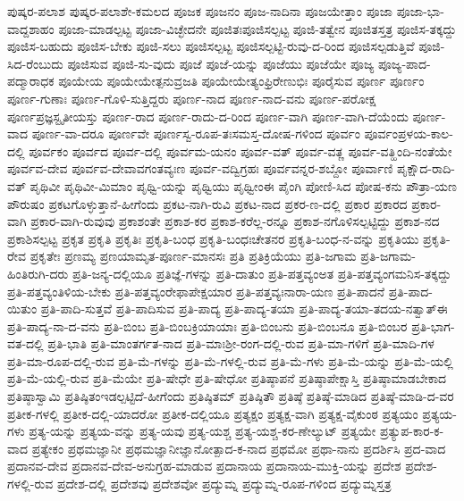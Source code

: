 {ಪುಷ್ಕರ-ಪಲಾಶ
ಪುಷ್ಕರ-ಪಲಾಶೇ-ಕಮಲದ
ಪೂಜಕ
ಪೂಜನಂ
ಪೂಜ-ನಾದಿನಾ
ಪೂಜಯೇತ್ತಾಂ
ಪೂಜಾ
ಪೂಜಾ-ಭಾ-ವಾದ್ದಶಾಹಂ
ಪೂಜಾ-ಮಾಡಲ್ಪಟ್ಟ
ಪೂಜಾ-ವಿಚ್ಛೇದನೇ
ಪೂಜಿತಃಪೂಜಿಸಲ್ಪಟ್ಟ
ಪೂಜಿ-ತತ್ವೇನ
ಪೂಜಿತಸ್ತತ್ರ
ಪೂಜಿಸ-ತಕ್ಕದ್ದು
ಪೂಜಿಸ-ಬಹುದು
ಪೂಜಿಸ-ಬೇಕು
ಪೂಜಿ-ಸಲು
ಪೂಜಿಸಲ್ಪಟ್ಟ
ಪೂಜಿಸಲ್ಪಟ್ಟಿ-ರುವು-ದ-ರಿಂದ
ಪೂಜಿಸಲ್ಪಡುತ್ತಿವೆ
ಪೂಜಿ-ಸಿದ-ರೆಂಬುದು
ಪೂಜಿಸುವ
ಪೂಜಿ-ಸು-ವುದು
ಪೂಜೆ
ಪೂಜೆ-ಯನ್ನು
ಪೂಜೆಯು
ಪೂಜೆಯೇ
ಪೂಜ್ಯ
ಪೂಜ್ಯ-ಪಾದ-ಪದ್ಮಾರಾಧಕ
ಪೂಯೇಯ
ಪೂಯೇಯೇತ್ಪನುವ್ರಜತಿ
ಪೂಯೇಯೇತ್ಯಂಫ್ರಿರೇಣುಭಿಃ
ಪೂರೈಸುವ
ಪೂರ್ಣ
ಪೂರ್ಣಂ
ಪೂರ್ಣ-ಗುಣಾಃ
ಪೂರ್ಣ-ಗೊಳಿ-ಸುತ್ತಿದ್ದರು
ಪೂರ್ಣ-ನಾದ
ಪೂರ್ಣ-ನಾದ-ವನು
ಪೂರ್ಣ-ಪರೋಕ್ಷ
ಪೂರ್ಣಪ್ರಜ್ಞಸ್ಟೃತೀಯಸ್ತು
ಪೂರ್ಣ-ರಾದ
ಪೂರ್ಣ-ರಾದು-ದ-ರಿಂದ
ಪೂರ್ಣ-ವಾಗಿ
ಪೂರ್ಣ-ವಾಗಿ-ದೆಯೆಂದು
ಪೂರ್ಣ-ವಾದ
ಪೂರ್ಣ-ವಾ-ದರೂ
ಪೂರ್ಣವೇ
ಪೂರ್ಣಸ್ವ-ರೂಪ-ತಃಸಮಸ್ತ-ದೋಷ-ಗಳಿಂದ
ಪೂರ್ವಂ
ಪೂರ್ವಂಪ್ರಳಯ-ಕಾಲ-ದಲ್ಲಿ
ಪೂರ್ವಕಂ
ಪೂರ್ವದ
ಪೂರ್ವ-ದಲ್ಲಿ
ಪೂರ್ವಮ-ಯನಂ
ಪೂರ್ವ-ವತ್
ಪೂರ್ವ-ವತ್ಣ
ಪೂರ್ವ-ವತ್ಹಿಂದಿ-ನಂತೆಯೇ
ಪೂರ್ವವ-ದೇವ
ಪೂರ್ವವ-ದೇವಾವಗಂತವ್ಯಃಣ
ಪೂರ್ವ-ವದ್ವಿಗ್ರಹಃ
ಪೂರ್ವವನ್ನರ-ಶಬ್ದೋ
ಪೂರ್ವಾಣಿ
ಪೃಕ್ಷೌದ-ರಾದಿ-ವತ್
ಪೃಥಿವೀ
ಪೃಥಿವೀ-ಮಿಮಾಂ
ಪೃಥ್ವಿ-ಯನ್ನು
ಪೃಥ್ವಿಯು
ಪೃಥ್ವೀಂಈ
ಪೈಂಗಿ
ಪೋಣಿ-ಸಿದ
ಪೋಷ-ಕನು
ಪೌತ್ರಾ-ಯಣ
ಪೌರುಷಂ
ಪ್ರಕಟಗೊಳ್ಳುತ್ತಾನೆ-ಹೀಗೆಂದು
ಪ್ರಕಟ-ನಾಗಿ-ರುವಿ
ಪ್ರಕಟ-ನಾದ
ಪ್ರಕರ-ಣ-ದಲ್ಲಿ
ಪ್ರಕಾರ
ಪ್ರಕಾರದ
ಪ್ರಕಾರ-ವಾಗಿ
ಪ್ರಕಾರ-ವಾಗಿ-ರುವುವು
ಪ್ರಕಾಶಂತೇ
ಪ್ರಕಾಶ-ಕರ
ಪ್ರಕಾಶ-ಕರೆಲ್ಲ-ರನ್ನೂ
ಪ್ರಕಾಶ-ನಗೊಳಿಸಲ್ಪಟ್ಟಿದ್ದು
ಪ್ರಕಾಶ-ನದ
ಪ್ರಕಾಶಿಸಲ್ಪಟ್ಟ
ಪ್ರಕೃತ
ಪ್ರಕೃತಿ
ಪ್ರಕೃತಿಃ
ಪ್ರಕೃತಿ-ಬಂಧ
ಪ್ರಕೃತಿ-ಬಂಧಃಚೇತನರ
ಪ್ರಕೃತಿ-ಬಂಧ-ನ-ವನ್ನು
ಪ್ರಕೃತಿಯು
ಪ್ರಕೃತಿ-ರೇವ
ಪ್ರಕೃತೇಃ
ಪ್ರಣಮ್ಯ
ಪ್ರಣಯಾಮೃತ-ಪೂರ್ಣ-ಮಾನಸಃ
ಪ್ರತಿ
ಪ್ರತಿಕ್ರಿಯೆಯು
ಪ್ರತಿ-ಜಗಾಮ
ಪ್ರತಿ-ಜಗಾಮ-ಹಿಂತಿರುಗಿ-ದರು
ಪ್ರತಿ-ಜನ್ಯ-ದಲ್ಲಿಯೂ
ಪ್ರತಿಜ್ಞೆ-ಗಳನ್ನು
ಪ್ರತಿ-ದಾತುಂ
ಪ್ರತಿ-ಪತ್ತವ್ಯಂಅತ
ಪ್ರತಿ-ಪತ್ತವ್ಯಂಗಮನಿಸ-ತಕ್ಕದ್ದು
ಪ್ರತಿ-ಪತ್ತವ್ಯಂತಿಳಿಯ-ಬೇಕು
ಪ್ರತಿ-ಪತ್ತವ್ಯಂರೇಫಾಪೇಕ್ಷಯಾರ
ಪ್ರತಿ-ಪತ್ತವ್ಯಃನಾರಾ-ಯಣ
ಪ್ರತಿ-ಪಾದನೆ
ಪ್ರತಿ-ಪಾದ-ಯಿತುಂ
ಪ್ರತಿ-ಪಾದಿ-ಸುತ್ತವೆ
ಪ್ರತಿ-ಪಾದಿಸುವ
ಪ್ರತಿ-ಪಾದ್ಯ
ಪ್ರತಿ-ಪಾದ್ಯ-ತಯಾ
ಪ್ರತಿ-ಪಾದ್ಯ-ತಯಾ-ತದಯ-ನತ್ವಾತ್ಈ
ಪ್ರತಿ-ಪಾದ್ಯ-ನಾ-ದ-ವನು
ಪ್ರತಿ-ಬಿಂಬ
ಪ್ರತಿ-ಬಿಂಬಕ್ರಿಯಾಯಾಃ
ಪ್ರತಿ-ಬಿಂಬನು
ಪ್ರತಿ-ಬಿಂಬನೂ
ಪ್ರತಿ-ಬಿಂಬರ
ಪ್ರತಿ-ಭಾಗ-ವತ-ದಲ್ಲಿ
ಪ್ರತಿ-ಭಾತಿ
ಪ್ರತಿ-ಮಾಂತರ್ಗತ-ನಾದ
ಪ್ರತಿ-ಮಾಃಶ್ರೀ-ರಂಗ-ದಲ್ಲಿ-ರುವ
ಪ್ರತಿ-ಮಾ-ಗಳಿಗೆ
ಪ್ರತಿ-ಮಾದಿ-ಗಳ
ಪ್ರತಿ-ಮಾ-ರೂಪ-ದಲ್ಲಿ-ರುವ
ಪ್ರತಿ-ಮೆ-ಗಳನ್ನು
ಪ್ರತಿ-ಮೆ-ಗಳಲ್ಲಿ-ರುವ
ಪ್ರತಿ-ಮೆ-ಗಳು
ಪ್ರತಿ-ಮೆ-ಯನ್ನು
ಪ್ರತಿ-ಮೆ-ಯಲ್ಲಿ
ಪ್ರತಿ-ಮೆ-ಯಲ್ಲಿ-ರುವ
ಪ್ರತಿ-ಮೆಯೇ
ಪ್ರತಿ-ಷೇಧೇ
ಪ್ರತಿ-ಷೇಧೋ
ಪ್ರತಿಷ್ಠಾಪನೆ
ಪ್ರತಿಷ್ಠಾಪೇಕ್ಷಾಸ್ತಿ
ಪ್ರತಿಷ್ಠಾಮಾಡಬೇಕಾದ
ಪ್ರತಿಷ್ಠಾಸ್ವಾಮಿ
ಪ್ರತಿಷ್ಠಿತಂಇಡಲ್ಪಟ್ಟಿದೆ-ಹೀಗೆಂದು
ಪ್ರತಿಷ್ಠಿತಮ್
ಪ್ರತಿಷ್ಠಿತೌ
ಪ್ರತಿಷ್ಠೆ
ಪ್ರತಿಷ್ಠೆ-ಮಾಡಿದ
ಪ್ರತಿಷ್ಠೆ-ಮಾಡಿ-ದ-ವರ
ಪ್ರತೀಕ-ಗಳಲ್ಲಿ
ಪ್ರತೀಕ-ದಲ್ಲಿ-ಯಾದರೋ
ಪ್ರತೀಕ-ದಲ್ಲಿಯೂ
ಪ್ರತ್ಯಕ್ಷಂ
ಪ್ರತ್ಯಕ್ಷ-ವಾಗಿ
ಪ್ರತ್ಯಕ್ಷ-ವೈಕುಂಠ
ಪ್ರತ್ಯಯಂ
ಪ್ರತ್ಯಯ-ಗಳು
ಪ್ರತ್ಯ-ಯನ್ನು
ಪ್ರತ್ಯಯ-ವನ್ನು
ಪ್ರತ್ಯ-ಯವು
ಪ್ರತ್ಯ-ಯಶ್ಚ
ಪ್ರತ್ಯ-ಯಶ್ಚ-ಕರ-ಣೇಲ್ಯುಟ್
ಪ್ರತ್ಯಯೇ
ಪ್ರತ್ಯುಪ-ಕಾರ-ಕ-ವಾದ
ಪ್ರತ್ಯೇಕಂ
ಪ್ರಥಮಜ್ಞಾನೀ
ಪ್ರಥಮಜ್ಞಾನೀಜ್ಞಾನೋತ್ಪಾದ-ಕ-ನಾದ
ಪ್ರಥಮೋ
ಪ್ರಥಾ-ನಾನು
ಪ್ರದರ್ಶಿಸಿ
ಪ್ರದ-ವಾದ
ಪ್ರದಾನವ-ದೇವ
ಪ್ರದಾನವ-ದೇವ-ಅನುಗ್ರಹ-ಮಾಡುವ
ಪ್ರದಾನಾಯ
ಪ್ರದಾನಾಯ-ಮುಕ್ತಿ-ಯನ್ನು
ಪ್ರದೇಶ
ಪ್ರದೇಶ-ಗಳಲ್ಲಿ-ರುವ
ಪ್ರದೇಶ-ದಲ್ಲಿ
ಪ್ರದೇಶವು
ಪ್ರದೇಶವೋ
ಪ್ರದ್ಯುಮ್ನ
ಪ್ರದ್ಯುಮ್ನ-ರೂಪ-ಗಳಿಂದ
ಪ್ರದ್ಯುಮ್ನಸ್ತತ್ರ
}
